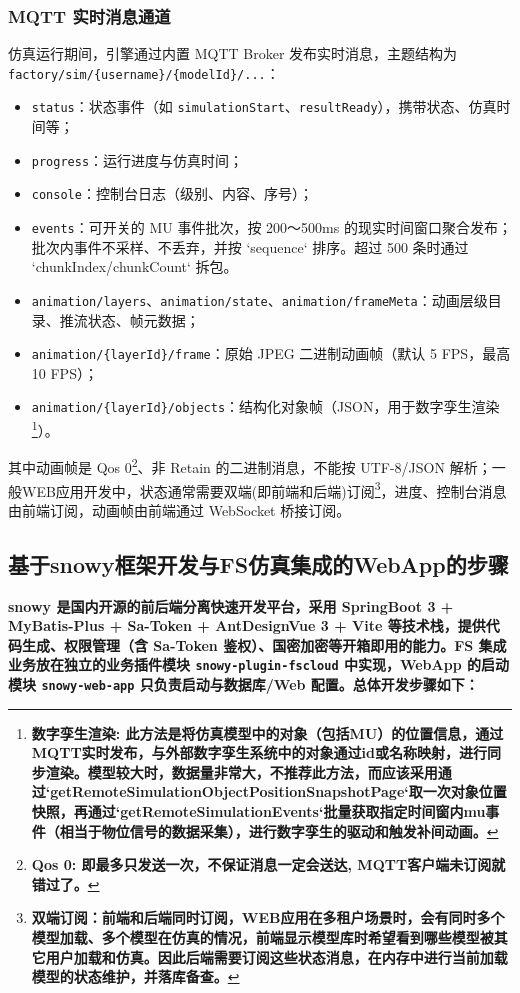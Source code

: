 \subsubsection{MQTT 实时消息通道}
仿真运行期间，引擎通过内置 MQTT Broker 发布实时消息，主题结构为 \texttt{factory/sim/\{username\}/\{modelId\}/...}：
\begin{itemize}
	\item \texttt{status}：状态事件（如 \texttt{simulationStart}、\texttt{resultReady}），携带状态、仿真时间等；
	\item \texttt{progress}：运行进度与仿真时间；
	\item \texttt{console}：控制台日志（级别、内容、序号）；
	\item \texttt{events}：可开关的 MU 事件批次，按 200～500ms 的现实时间窗口聚合发布；批次内事件不采样、不丢弃，并按 `sequence` 排序。超过 500 条时通过 `chunkIndex/chunkCount` 拆包。
	\item \texttt{animation/layers}、\texttt{animation/state}、\texttt{animation/frameMeta}：动画层级目录、推流状态、帧元数据；
	\item \texttt{animation/\{layerId\}/frame}：原始 JPEG 二进制动画帧（默认 5 FPS，最高 10 FPS）；
	\item \texttt{animation/\{layerId\}/objects}：结构化对象帧（JSON，用于数字孪生渲染\footnote{\bf{数字孪生渲染}: 此方法是将仿真模型中的对象（包括MU）的位置信息，通过MQTT实时发布，与外部数字孪生系统中的对象通过id或名称映射，进行同步渲染。模型较大时，数据量非常大，不推荐此方法，而应该采用通过`getRemoteSimulationObjectPositionSnapshotPage`取一次对象位置快照，再通过`getRemoteSimulationEvents`批量获取指定时间窗内mu事件（相当于物位信号的数据采集），进行数字孪生的驱动和触发补间动画。 }）。
\end{itemize}
其中动画帧是 Qos 0\footnote{\bf{Qos 0}: 即最多只发送一次，不保证消息一定会送达, MQTT客户端未订阅就错过了。}、非 Retain 的二进制消息，不能按 UTF-8/JSON 解析；一般WEB应用开发中，状态通常需要双端(即前端和后端)订阅\footnote{\bf{双端订阅}：前端和后端同时订阅，WEB应用在多租户场景时，会有同时多个模型加载、多个模型在仿真的情况，前端显示模型库时希望看到哪些模型被其它用户加载和仿真。因此后端需要订阅这些状态消息，在内存中进行当前加载模型的状态维护，并落库备查。}，进度、控制台消息由前端订阅，动画帧由前端通过 WebSocket 桥接订阅。

\subsection{基于snowy框架开发与FS仿真集成的WebApp的步骤}
\bf{snowy} 是国内开源的前后端分离快速开发平台，采用 SpringBoot 3 + MyBatis-Plus + Sa-Token + AntDesignVue 3 + Vite 等技术栈，提供代码生成、权限管理（含 Sa-Token 鉴权）、国密加密等开箱即用的能力。FS 集成业务放在独立的业务插件模块 \texttt{snowy-plugin-fscloud} 中实现，WebApp 的启动模块 \texttt{snowy-web-app} 只负责启动与数据库/Web 配置。总体开发步骤如下：

